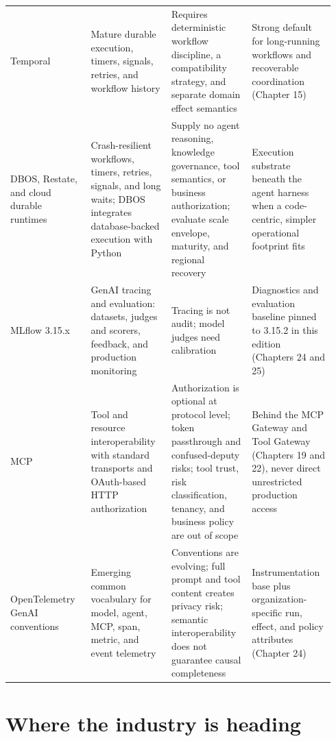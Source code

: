 \begin{longtable}{@{}Y{0.2350\linewidth}Y{0.2350\linewidth}Y{0.2350\linewidth}Y{0.2350\linewidth}@{}}
Temporal & Mature durable execution, timers, signals, retries, and workflow history & Requires deterministic workflow discipline, a compatibility strategy, and separate domain effect semantics & Strong default for long-running workflows and recoverable coordination (Chapter 15) \\
DBOS, Restate, and cloud durable runtimes & Crash-resilient workflows, timers, retries, signals, and long waits; DBOS integrates database-backed execution with Python & Supply no agent reasoning, knowledge governance, tool semantics, or business authorization; evaluate scale envelope, maturity, and regional recovery & Execution substrate beneath the agent harness when a code-centric, simpler operational footprint fits \\
MLflow 3.15.x & GenAI tracing and evaluation: datasets, judges and scorers, feedback, and production monitoring & Tracing is not audit; model judges need calibration & Diagnostics and evaluation baseline pinned to 3.15.2 in this edition (Chapters 24 and 25) \\
MCP & Tool and resource interoperability with standard transports and OAuth-based HTTP authorization & Authorization is optional at protocol level; token passthrough and confused-deputy risks; tool trust, risk classification, tenancy, and business policy are out of scope & Behind the MCP Gateway and Tool Gateway (Chapters 19 and 22), never direct unrestricted production access \\
OpenTelemetry GenAI conventions & Emerging common vocabulary for model, agent, MCP, span, metric, and event telemetry & Conventions are evolving; full prompt and tool content creates privacy risk; semantic interoperability does not guarantee causal completeness & Instrumentation base plus organization-specific run, effect, and policy attributes (Chapter 24) \\
\end{longtable}
\BookTableEnd

\section{Where the industry is heading}

